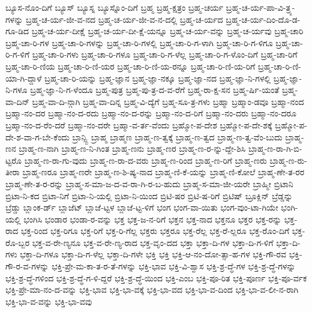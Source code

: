 {ಬ್ಯೂಸ-ನೊಂ-ದಿಗೆ
ಬ್ಯೂಸ್
ಬ್ಯೂಸ್ನ
ಬ್ಯೂಸ್ನೊಂ-ದಿಗೆ
ಬ್ರಹ್ಮ
ಬ್ರಹ್ಮ-ಕ್ಷತ್ರಂ
ಬ್ರಹ್ಮ-ಚರ್ಯ
ಬ್ರಹ್ಮ-ಚ-ರ್ಯ-ಪಾ-ವಿ-ತ್ರ್ಯ-ಗಳನ್ನು
ಬ್ರಹ್ಮ-ಚ-ರ್ಯ-ಜೀ-ವ-ನದ
ಬ್ರಹ್ಮ-ಚ-ರ್ಯ-ಜೀ-ವ-ನ-ದಲ್ಲಿ
ಬ್ರಹ್ಮ-ಚ-ರ್ಯದ
ಬ್ರಹ್ಮ-ಚ-ರ್ಯ-ದಿಂ-ದೊ-ಡ-ಗೂ-ಡಿದ
ಬ್ರಹ್ಮ-ಚ-ರ್ಯ-ದೀಕ್ಷೆ
ಬ್ರಹ್ಮ-ಚ-ರ್ಯ-ದೀ-ಕ್ಷೆ-ಯನ್ನೂ
ಬ್ರಹ್ಮ-ಚ-ರ್ಯ-ವನ್ನು
ಬ್ರಹ್ಮ-ಚ-ರ್ಯವು
ಬ್ರಹ್ಮ-ಚಾರಿ
ಬ್ರಹ್ಮ-ಚಾ-ರಿ-ಗಳ
ಬ್ರಹ್ಮ-ಚಾ-ರಿ-ಗಳನ್ನು
ಬ್ರಹ್ಮ-ಚಾ-ರಿ-ಗಳಲ್ಲಿ
ಬ್ರಹ್ಮ-ಚಾ-ರಿ-ಗ-ಳಾಗಿ
ಬ್ರಹ್ಮ-ಚಾ-ರಿ-ಗ-ಳಿಗೂ
ಬ್ರಹ್ಮ-ಚಾ-ರಿ-ಗ-ಳಿಗೆ
ಬ್ರಹ್ಮ-ಚಾ-ರಿ-ಗಳು
ಬ್ರಹ್ಮ-ಚಾ-ರಿ-ಗಳೂ
ಬ್ರಹ್ಮ-ಚಾ-ರಿ-ಗ-ಳೆಲ್ಲ
ಬ್ರಹ್ಮ-ಚಾ-ರಿ-ಗ-ಳೊಂ-ದಿಗೆ
ಬ್ರಹ್ಮ-ಚಾ-ರಿಗೆ
ಬ್ರಹ್ಮ-ಚಾ-ರಿ-ಣಿಯ
ಬ್ರಹ್ಮ-ಚಾ-ರಿ-ಣಿ-ಯರ
ಬ್ರಹ್ಮ-ಚಾ-ರಿ-ಣಿ-ಯ-ರನ್ನೂ
ಬ್ರಹ್ಮ-ಚಾ-ರಿ-ಣಿ-ಯ-ರಿಗೆ
ಬ್ರಹ್ಮ-ಚಾ-ರಿ-ಣಿ-ಯಾ-ಗಿ-ದ್ದಾಳೆ
ಬ್ರಹ್ಮ-ಚಾ-ರಿ-ಯನ್ನು
ಬ್ರಹ್ಮ-ಜ್ಞಾನ
ಬ್ರಹ್ಮ-ಜ್ಞಾ-ನಕ್ಕೂ
ಬ್ರಹ್ಮ-ಜ್ಞಾ-ನದ
ಬ್ರಹ್ಮ-ಜ್ಞಾ-ನಿ-ಗಳಲ್ಲಿ
ಬ್ರಹ್ಮ-ಜ್ಞಾ-ನಿ-ಗಳೂ
ಬ್ರಹ್ಮ-ಜ್ಞಾ-ನಿ-ಗ-ಳೆಂದೂ
ಬ್ರಹ್ಮ-ಪುತ್ರ
ಬ್ರಹ್ಮ-ಪು-ತ್ರ-ದ-ವ-ರೆಗೆ
ಬ್ರಹ್ಮ-ರಾ-ಕ್ಷ-ಸನ
ಬ್ರಹ್ಮ-ರ್ಷಿ-ಯಂತೆ
ಬ್ರಹ್ಮ-ವಾ-ದಿನ್
ಬ್ರಹ್ಮ-ವಾ-ದಿ-ನ್ಗಾಗಿ
ಬ್ರಹ್ಮ-ವಾ-ದಿನ್ನ
ಬ್ರಹ್ಮ-ವಿ-ದ್ಯೆಗೆ
ಬ್ರಹ್ಮ-ಸೂ-ತ್ರ-ಗಳು
ಬ್ರಹ್ಮಾ
ಬ್ರಹ್ಮಾಂ-ಡವೂ
ಬ್ರಹ್ಮಾ-ನಂದ
ಬ್ರಹ್ಮಾ-ನಂ-ದರ
ಬ್ರಹ್ಮಾ-ನಂ-ದ-ರದು
ಬ್ರಹ್ಮಾ-ನಂ-ದ-ರನ್ನು
ಬ್ರಹ್ಮಾ-ನಂ-ದ-ರಿಗೆ
ಬ್ರಹ್ಮಾ-ನಂ-ದರು
ಬ್ರಹ್ಮಾ-ನಂ-ದರೂ
ಬ್ರಹ್ಮಾ-ನಂ-ದ-ರೆಂ-ದರೆ
ಬ್ರಹ್ಮಾ-ನಂ-ದರೇ
ಬ್ರಹ್ಮಾ-ವ-ರ್ತ-ವೆಂದು
ಬ್ರಹ್ಮೋ-ಪ-ದೇಶ
ಬ್ರಹ್ಮೋ-ಪ-ದೇ-ಶಕ್ಕೆ
ಬ್ರಹ್ಮೋ-ಪ-ದೇ-ಶ-ವಾ-ಗ-ಬೇ-ಕೆಂದು
ಬ್ರಾನ್ಸ್ಬಿ
ಬ್ರಾಹ್ಮ
ಬ್ರಾಹ್ಮಣ
ಬ್ರಾಹ್ಮ-ಣ-ತ್ವಕ್ಕೆ
ಬ್ರಾಹ್ಮ-ಣ-ತ್ವದ
ಬ್ರಾಹ್ಮ-ಣ-ತ್ವ-ವೆಂ-ಬುದು
ಬ್ರಾಹ್ಮ-ಣನ
ಬ್ರಾಹ್ಮ-ಣ-ನಾಗಿ
ಬ್ರಾಹ್ಮ-ಣ-ನಿ-ಗಿಂತ
ಬ್ರಾಹ್ಮ-ಣನು
ಬ್ರಾಹ್ಮ-ಣರ
ಬ್ರಾಹ್ಮ-ಣ-ರ-ನ್ನು-ದ್ದೇ-ಶಿಸಿ
ಬ್ರಾಹ್ಮ-ಣ-ರಾ-ಗಿ-ಬಿ-ಟ್ಟರೊ
ಬ್ರಾಹ್ಮ-ಣ-ರಾ-ಗು-ವುದು
ಬ್ರಾಹ್ಮ-ಣ-ರಾ-ದ-ವರು
ಬ್ರಾಹ್ಮ-ಣ-ರಿಂದ
ಬ್ರಾಹ್ಮ-ಣ-ರಿಗೆ
ಬ್ರಾಹ್ಮ-ಣರು
ಬ್ರಾಹ್ಮ-ಣ-ರು-ತೀರಾ
ಬ್ರಾಹ್ಮ-ಣರೂ
ಬ್ರಾಹ್ಮ-ಣರೇ
ಬ್ರಾಹ್ಮ-ಣ-ಶಿ-ಷ್ಯ-ನಾದ
ಬ್ರಾಹ್ಮ-ಣಿ-ಕೆ-ಯನ್ನು
ಬ್ರಾಹ್ಮ-ಣಿ-ಕೋಲೆ
ಬ್ರಾಹ್ಮ-ಣೇ-ತ-ರರ
ಬ್ರಾಹ್ಮ-ಣೇ-ತ-ರ-ರನ್ನು
ಬ್ರಾಹ್ಮ-ಸ-ಮಾ-ಜ-ದ-ವ-ರಾ-ಗಿ-ರ-ಬ-ಹುದು
ಬ್ರಾಹ್ಮ-ಸ-ಮಾ-ಜೀ-ಯರೇ
ಬ್ರಾಹ್ಮೀ
ಬ್ರಿಟಾನಿ
ಬ್ರಿಟಾ-ನಿ-ಕದ
ಬ್ರಿಟಾ-ನಿಗೆ
ಬ್ರಿಟಾ-ನಿ-ಯಲ್ಲಿ
ಬ್ರಿಟಾ-ನಿ-ಯಿಂದ
ಬ್ರಿಟಿ-ಷರ
ಬ್ರಿಟಿ-ಷ-ರಿಗೆ
ಬ್ರಿಟಿಷ್
ಬ್ರೂಕ್ಲಿನ್
ಬ್ರೆಡ್ಡನ್ನು
ಬ್ರೆಡ್ಡು
ಬ್ಲಾಂಕ-ರ್ಡ್
ಬ್ಲಾಜೆಟ್
ಬ್ಲಾಜೆ-ಟ್ಟಳ
ಬ್ಲಾಜೆ-ಟ್ಟ-ಳಿಗೆ
ಭಂಗ
ಭಂಗ-ವಾ-ಯಿತು
ಭಂಗ-ವುಂ-ಟಾ-ಗಿಯೇ
ಭಂಗಿ-ಯಲ್ಲಿ
ಭಂಗಿಸಿ
ಭಂಡಾರ
ಭಂಡಾ-ರ-ವನ್ನು
ಭಕ್ತ
ಭಕ್ತ-ಜ-ನ-ರಿಗೆ
ಭಕ್ತನ
ಭಕ್ತ-ನಾದ
ಭಕ್ತನೂ
ಭಕ್ತರ
ಭಕ್ತ-ರನ್ನು
ಭಕ್ತ-ರಾದ
ಭಕ್ತ-ರಿಂದ
ಭಕ್ತ-ರಿಗೂ
ಭಕ್ತ-ರಿಗೆ
ಭಕ್ತ-ರಿ-ಗೆಲ್ಲ
ಭಕ್ತರು
ಭಕ್ತರೂ
ಭಕ್ತ-ರೆಲ್ಲ
ಭಕ್ತ-ರೆ-ಲ್ಲರೂ
ಭಕ್ತ-ರೊಂ-ದಿಗೆ
ಭಕ್ತ-ರೊ-ಬ್ಬರ
ಭಕ್ತ-ವ-ರೇ-ಣ್ಯನೂ
ಭಕ್ತ-ವ-ರೇ-ಣ್ಯ-ರಾದ
ಭಕ್ತ-ವೃಂ-ದದ
ಭಕ್ತಾ
ಭಕ್ತಾ-ದಿ-ಗಳ
ಭಕ್ತಾ-ದಿ-ಗ-ಳಿಗೆ
ಭಕ್ತಾ-ದಿ-ಗಳು
ಭಕ್ತಾ-ದಿ-ಗಳೂ
ಭಕ್ತಾ-ದಿ-ಗ-ಳೆಲ್ಲ
ಭಕ್ತಾ-ದಿ-ಗಳೇ
ಭಕ್ತಿ
ಭಕ್ತಿ
ಭಕ್ತಿ-ಆ-ನಂ-ದೋ-ತ್ಸಾ-ಹ-ಗಳ
ಭಕ್ತಿ-ಗೌ-ರವ
ಭಕ್ತಿ-ಗೌ-ರ-ವ-ಗಳನ್ನು
ಭಕ್ತಿ-ಪ್ರೇ-ಮ-ಕಾ-ತ-ರ-ತೆ-ಗಳನ್ನು
ಭಕ್ತಿ-ಭಾವ
ಭಕ್ತಿ-ವಿ-ಶ್ವಾಸ
ಭಕ್ತಿ-ಶ್ರ-ದ್ಧೆ-ಗಳ
ಭಕ್ತಿ-ಶ್ರ-ದ್ಧೆ-ಗಳನ್ನು
ಭಕ್ತಿ-ಶ್ರ-ದ್ಧೆ-ಗಳಿಂದ
ಭಕ್ತಿ-ಶ್ರ-ದ್ಧೆ-ಗ-ಳಿ-ದ್ದರೆ
ಭಕ್ತಿ-ಶ್ರ-ದ್ಧೆ-ಯಿಂದ
ಭಕ್ತಿ-ಎಂಬ
ಭಕ್ತಿ-ಪೂ-ರಿತ
ಭಕ್ತಿ-ಪೂರ್ಣ
ಭಕ್ತಿ-ಪೂ-ರ್ವಕ
ಭಕ್ತಿ-ಪ್ರೇ-ಮಾ-ನಂ-ದ-ವನ್ನು
ಭಕ್ತಿ-ಭಾವ
ಭಕ್ತಿ-ಭಾ-ವಕ್ಕೆ
ಭಕ್ತಿ-ಭಾ-ವದ
ಭಕ್ತಿ-ಭಾ-ವ-ದಿಂದ
ಭಕ್ತಿ-ಭಾ-ವ-ಲೀ-ನ-ರಾಗಿ
ಭಕ್ತಿ-ಭಾ-ವ-ವನ್ನು
ಭಕ್ತಿ-ಭಾ-ವವು
}
